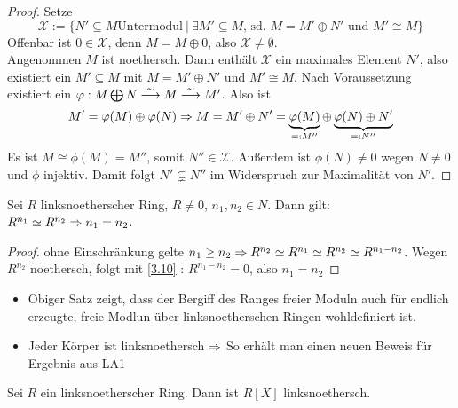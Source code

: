 \begin{proof} 
	Setze $$\mathcal{X} := \{N' \subseteq M \text{Untermodul} \ | \ \exists M' \subseteq M,\, \text{sd. }  M = M' \oplus N'\text{ und } M' \cong M\}$$
	Offenbar ist $0\in \mathcal{X}$, denn $M= M \oplus 0$, also $\mathcal{X} \neq \emptyset$. \\
	Angenommen $M$ ist noethersch. Dann enthält $\mathcal{X}$ ein maximales Element $N'$, also  existiert ein $M' \subseteq M$ mit $M = M' \oplus N'$ und $M' \cong M$. Nach Voraussetzung existiert ein $\varphi : M \bigoplus N \overset{\sim}{\longrightarrow} M \overset{\sim}{\longrightarrow} M'$. Also ist 
	$$M' = \varphi(M) \oplus \varphi(N) \Rightarrow M = M' \oplus N' = \underbrace{\varphi(M)}_{=:M''} \oplus \underbrace{\varphi(N) \oplus N'}_{=:N''} $$ Es ist $M \cong \phi(M) = M''$, somit $ N'' \in \mathcal{X}$. Außerdem ist $\phi(N) \neq 0 $ wegen $ N \neq 0 $ und $\phi$ injektiv. Damit folgt $N' \subsetneq N'' $ im Widerspruch zur Maximalität von $N'$.
\end{proof}
\begin{sa}\label{3.11}
	Sei $R$ linksnoetherscher Ring, $R \neq 0$, $n_1,n_2 \in N$. Dann gilt: $ R^{n_1} \simeq R^{n_2} \Rightarrow n_1 = n_2 $.
\end{sa}
\begin{proof}
	ohne Einschränkung gelte $n_1 \geq n_2  \Rightarrow R^{n_2} \simeq R^{n_1} \simeq R^{n_2} \simeq R^{n_1 - n_2} $. Wegen $R^{n_2}$ noethersch, folgt mit \ref{3.10} : $R^{n_1 - n_2} =0$, also $ n_1=n_2$
\end{proof}
\begin{anm}
	\begin{itemize}
		\item Obiger Satz zeigt, dass der Bergiff des Ranges freier Moduln auch für endlich erzeugte, freie Modlun über linksnoetherschen Ringen wohldefiniert ist. 
		\item Jeder Körper ist linksnoethersch $\Rightarrow$ So erhält man einen neuen Beweis für Ergebnis aus LA1
	\end{itemize}
\end{anm}
\begin{sa}\label{3.12}
	Sei $R$ ein linksnoetherscher Ring. Dann ist $R[X]$ linksnoethersch.
\end{sa}
